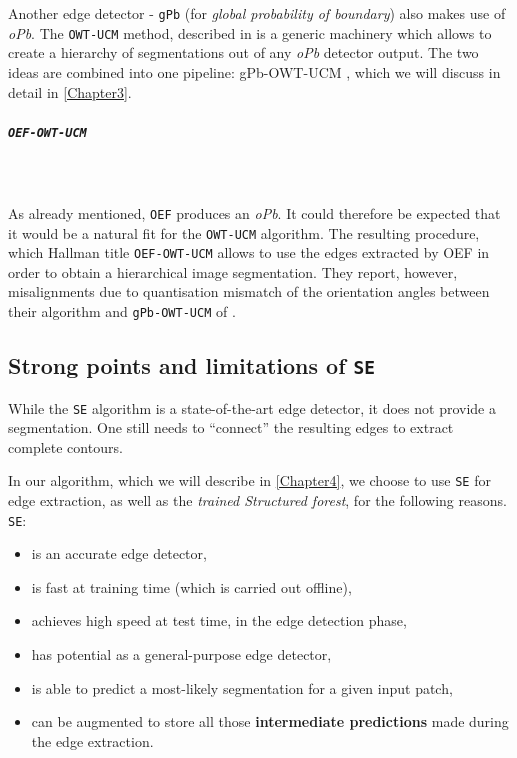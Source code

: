 Another edge detector - {\tt gPb} (for {\it global probability of boundary}) \cite{Maire2008using} also makes use of {\it oPb}. The {\tt OWT-UCM} method, described in \cite{Arbelaez09} is a generic machinery which allows to create a hierarchy of segmentations out of any {\it oPb} detector output. The two ideas are combined into %
one pipeline: gPb-OWT-UCM \cite{Arbelaez11}, which we will discuss %
in detail in \cref{Chapter3}. 

\subparagraph{{\tt OEF-OWT-UCM}}\mbox{}\\\mbox{}\\
\label{par:ch2-OEF-OWT-UCM}
As already mentioned, {\tt OEF} produces an {\it oPb}. It could therefore be expected that it would be a natural fit for the {\tt OWT-UCM} algorithm. The resulting procedure, which Hallman \etal title {\tt OEF-OWT-UCM} allows to use the edges extracted by OEF %
in order to obtain a hierarchical image segmentation. They report, however, misalignments due to quantisation mismatch of the orientation angles between their algorithm and {\tt gPb-OWT-UCM} of \cite{Arbelaez11}.

\subsection{Strong points and limitations of {\tt SE}}
While the {\tt SE} algorithm is a state-of-the-art edge detector, it does not provide a segmentation. One still needs to ``connect'' the resulting edges to extract complete contours. %

In our algorithm, which we will describe in \cref{Chapter4}, we choose to use {\tt SE} for edge extraction, as well as %
the {\it trained Structured forest}, for the following reasons. {\tt SE}:
\begin{itemize}
 \item is an accurate edge detector,
 \item is fast at training time (which is carried out %
 offline),
 \item achieves high %
 speed at test time, in the edge detection phase, %
 \item has potential as a general-purpose edge detector, %
 \item is able to predict a most-likely segmentation for a given input patch,
 \item can be augmented to store all those {\bf intermediate predictions} made during the edge extraction.
\end{itemize}

